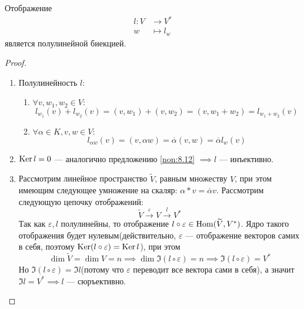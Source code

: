 \documentclass[../main.tex]{subfiles}
\begin{document}
\begin{theorem-non}
\label{non:8.13}
  Отображение
  \begin{align*}
    l\colon V &\to V^{*} \\
            w &\mapsto l_w
  \end{align*}
  является полулинейной биекцией.
\end{theorem-non}
\begin{proof}
  \begin{enumerate}
    \item Полулинейность $l$:
    \begin{enumerate}
      \item $\forall v, w_1, w_2 \in V\colon$
      \begin{equation*}
        l_{w_1}(v) + l_{w_2}(v) = (v, w_1) + (v, w_2) = (v, w_1 + w_2) = l_{w_1 + w_2}(v)
      \end{equation*}

      \item $\forall \alpha \in K, v, w \in V\colon$
      \begin{equation*}
        l_{\alpha w}(v) = (v, \alpha w) = \overline{\alpha} (v, w) = \overline{\alpha} l_w(v)
      \end{equation*}
    \end{enumerate}
    \item $\operatorname{Ker} l = 0$ --- аналогично предложению \ref{non:8.12} $\implies l$ --- инъективно.
    \item Рассмотрим линейное пространство $\widetilde{V}$, равным множеству $V$, при этом имеющим следующее умножение на скаляр: $\alpha * v = \overline{\alpha} v$. Рассмотрим следующую цепочку отображений:
    \begin{equation*}
      \widetilde{V} \overset{\varepsilon}{\longrightarrow} V \overset{l}{\longrightarrow} V^{*}
    \end{equation*}
    Так как $\varepsilon, l$ полулинейны, то отображение $l \circ \varepsilon \in \operatorname{Hom}(\widetilde{V}, V^{*})$. Ядро такого отображения будет нулевым(действительно, $\varepsilon$ --- отображение векторов самих в себя, поэтому $\operatorname{Ker} (l \circ \varepsilon) = \operatorname{Ker} l$), при этом
    \begin{equation*}
      \dim \widetilde{V} = \dim V = n \implies \dim \Im (l \circ \varepsilon) = n \implies \Im (l \circ \varepsilon) = V^{*}
    \end{equation*}
    Но $\Im (l \circ \varepsilon) = \Im l$(потому что $\varepsilon$ переводит все вектора сами в себя), а значит $\Im l = V^{*} \implies l$ --- сюръективно.
  \end{enumerate}
\end{proof}
\end{document}

